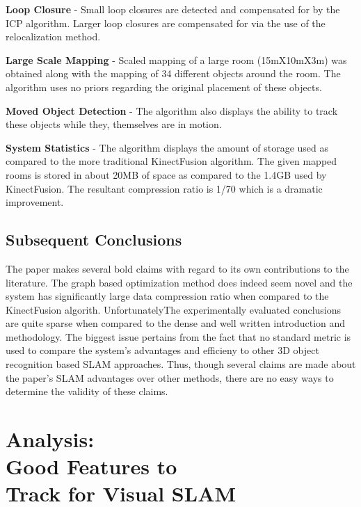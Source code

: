 \documentclass[10pt,twocolumn,letterpaper]{article}
\begin{document}
\textbf{Loop Closure} - 
Small loop closures are detected and compensated for by the ICP algorithm. Larger loop closures are compensated for via the use of the relocalization method. 

\textbf{Large Scale Mapping} - 
Scaled mapping of a large room (15mX10mX3m) was obtained along with the mapping of 34 different objects around the room. The algorithm uses no priors regarding the original placement of these objects.

\textbf{Moved Object Detection} - 
The algorithm also displays the ability to track these objects while they, themselves are in motion. 

\textbf{System Statistics} - 
The algorithm displays the amount of storage used as compared to the more traditional KinectFusion algorithm. The given mapped rooms is stored in about 20MB of space as compared to the 1.4GB used by KinectFusion. The resultant compression ratio is 1/70 which is a dramatic improvement. 

\subsection{Subsequent Conclusions}
The paper makes several bold claims with regard to its own contributions to the literature. The graph based optimization method does indeed seem novel and the system has significantly large data compression ratio when compared to the KinectFusion algorith. UnfortunatelyThe experimentally evaluated conclusions are quite sparse when compared to the dense and well written introduction and methodology. The biggest issue pertains from the fact that no standard metric is used to compare the system's advantages and efficieny to other 3D object recognition based SLAM approaches. Thus, though several claims are made about the paper's SLAM advantages over other methods, there are no easy ways to determine the validity of these claims.

\clearpage


 

\section {Analysis: \\Good Features to \\Track for Visual SLAM}
\end{document}
